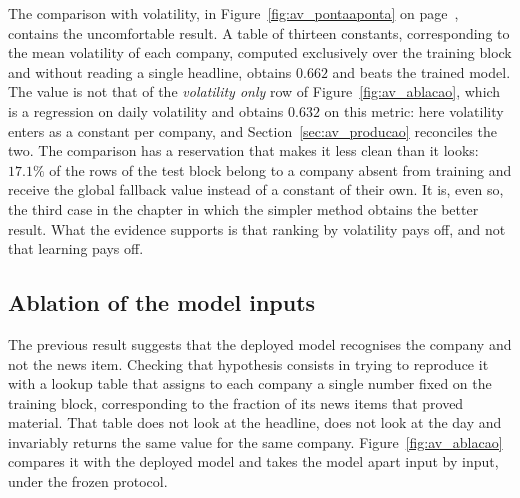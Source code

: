 The comparison with volatility, in Figure~\ref{fig:av_pontaaponta} on
page~\pageref{fig:av_pontaaponta}, contains the uncomfortable
result. A table of thirteen constants, corresponding to the mean volatility of each company,
computed exclusively over the training block and without reading a single headline, obtains $0.662$
and beats the trained model. The value is not that of the \emph{volatility only} row of
Figure~\ref{fig:av_ablacao}, which is a regression on daily volatility and obtains $0.632$ on this
metric: here volatility enters as a constant per company, and Section~\ref{sec:av_producao}
reconciles the two. The comparison has a reservation that makes it less clean than it
looks: $17.1\%$ of the rows of the test block belong to a company absent from training and receive
the global fallback value instead of a constant of their own. It is, even so, the third case in the chapter
in which the simpler method obtains the better result. What the evidence supports is that ranking
by volatility pays off, and not that learning pays off.

\subsection{Ablation of the model inputs}
\label{sec:av_ablacao}

The previous result suggests that the deployed model recognises the company and not the news item.
Checking that hypothesis consists in trying to reproduce it with a lookup table that assigns to each
company a single number fixed on the training block, corresponding to the fraction of its news items
that proved material. That table does not look at the headline, does not look at the day and
invariably returns the same value for the same company. Figure~\ref{fig:av_ablacao} compares it
with the deployed model and takes the model apart input by input, under the frozen protocol.

